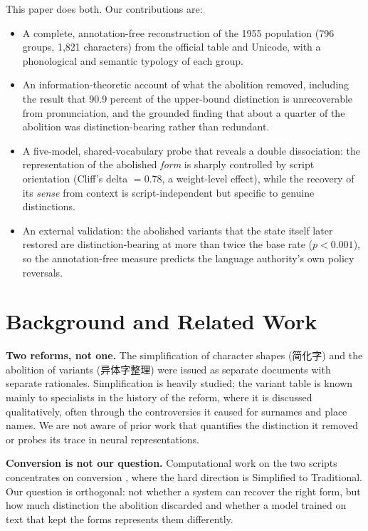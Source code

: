 \documentclass[10pt,twocolumn]{article}
\begin{document}
This paper does both. Our contributions are:
\begin{itemize}
\setlength{\itemsep}{1pt}
\item A complete, annotation-free reconstruction of the 1955 population (796
groups, 1,821 characters) from the official table and Unicode, with a
phonological and semantic typology of each group.
\item An information-theoretic account of what the abolition removed, including
the result that 90.9 percent of the upper-bound distinction is unrecoverable from
pronunciation, and the grounded finding that about a quarter of the abolition was
distinction-bearing rather than redundant.
\item A five-model, shared-vocabulary probe that reveals a double dissociation:
the representation of the abolished \emph{form} is sharply controlled by script
orientation (Cliff's delta $= 0.78$, a weight-level effect), while the recovery
of its \emph{sense} from context is script-independent but specific to genuine
distinctions.
\item An external validation: the abolished variants that the state itself later
restored are distinction-bearing at more than twice the base rate
($p < 0.001$), so the annotation-free measure predicts the language authority's
own policy reversals.
\end{itemize}

\section{Background and Related Work}
\noindent\textbf{Two reforms, not one.} The simplification of character shapes
(简化字) and the abolition of variants (异体字整理) were issued as separate
documents with separate rationales. Simplification is heavily studied; the
variant table is known mainly to specialists in the history of the reform, where
it is discussed qualitatively, often through the controversies it caused for
surnames and place names. We are not aware of prior work that quantifies the
distinction it removed or probes its trace in neural representations.

\noindent\textbf{Conversion is not our question.} Computational work on the two
scripts concentrates on conversion \cite{opencc}, where the hard direction is
Simplified to Traditional. Our question is orthogonal: not whether a system can
recover the right form, but how much distinction the abolition discarded and
whether a model trained on text that kept the forms represents them differently.
\end{document}
